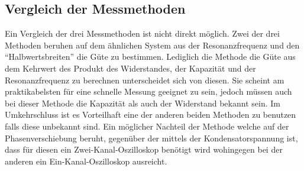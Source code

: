 \subsection{Vergleich der Messmethoden}
Ein Vergleich der drei Messmethoden ist nicht direkt möglich. Zwei der drei Methoden beruhen auf dem ähnlichen System aus der Resonanzfrequenz und den ``Halbwertsbreiten'' die Güte zu bestimmen. Lediglich die Methode die Güte aus dem Kehrwert des Produkt des Widerstandes, der Kapazität und der Resonanzfrequenz zu berechnen unterscheidet sich von diesen. Sie scheint am praktikabelsten für eine schnelle Messung geeignet zu sein, jedoch müssen auch bei dieser Methode die Kapazität als auch der Widerstand bekannt sein. Im Umkehrschluss ist es Vorteilhaft eine der anderen beiden Methoden zu benutzen falls diese unbekannt sind. Ein möglicher Nachteil der Methode welche auf der Phasenverschiebung beruht, gegenüber der mittels der Kondensatorspannung ist, dass für diesen ein Zwei-Kanal-Oszilloskop benötigt wird wohingegen bei der anderen ein Ein-Kanal-Oszilloskop ausreicht.
